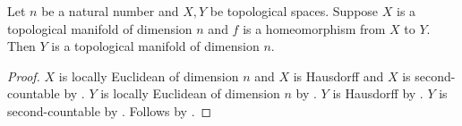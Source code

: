 \begin{theorem}\label{homeomorphism_preserves_topological_manifold}
    Let $n$ be a natural number and $X,Y$ be topological spaces.
    Suppose $X$ is a topological manifold of dimension $n$ and
        $f$ is a homeomorphism from $X$ to $Y$.
    Then $Y$ is a topological manifold of dimension $n$.
\end{theorem}
\begin{proof}
    $X$ is locally Euclidean of dimension $n$ and $X$ is Hausdorff and $X$ is second-countable by
        .
    $Y$ is locally Euclidean of dimension $n$ by .
    $Y$ is Hausdorff by .
    $Y$ is second-countable by .
    Follows by .
\end{proof}
